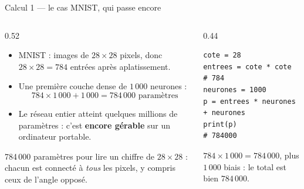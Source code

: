 \begin{frame}[fragile]{Calcul 1 --- le cas MNIST, qui passe encore}
\begin{columns}[t]
\begin{column}{0.52\textwidth}
\begin{itemize}
  \item MNIST : images de $28 \times 28$ pixels, donc
  $28 \times 28 = 784$ entrées après aplatissement.
  \item Une première couche dense de $1\,000$ neurones :
  \[
  784 \times 1\,000 + 1\,000 = 784\,000 \text{ paramètres}
  \]
  \item Le réseau entier atteint quelques millions de paramètres : c'est
  \textbf{encore gérable} sur un ordinateur portable.
\end{itemize}
\begin{wbox}
784\,000 paramètres pour lire un chiffre de $28 \times 28$ : chacun est
connecté à \emph{tous} les pixels, y compris ceux de l'angle opposé.
\end{wbox}
\end{column}
\begin{column}{0.44\textwidth}
\begin{codebox}
\begin{lstlisting}
cote = 28
entrees = cote * cote      # 784
neurones = 1000
p = entrees * neurones + neurones
print(p)                   # 784000
\end{lstlisting}
\end{codebox}
\begin{solbox}[Vérification]
$784 \times 1\,000 = 784\,000$, plus $1\,000$ biais :
le total est bien $784\,000$.
\end{solbox}
\end{column}
\end{columns}
\end{frame}

